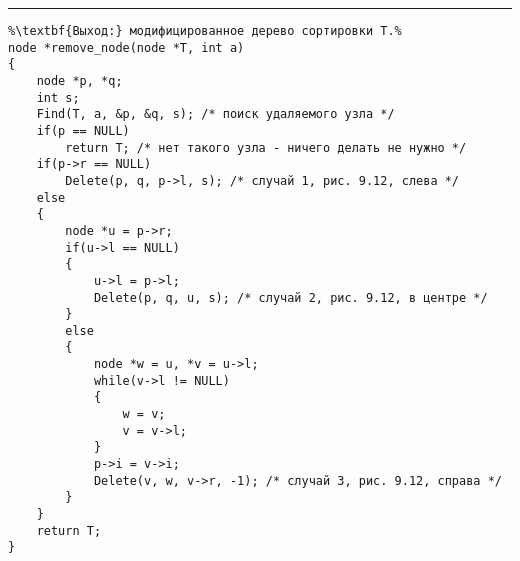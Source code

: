 \vspace{5pt} \hrule
\begin{lstlisting}[caption={Удаление узла из дерева сортировки}, label=p319, escapechar=\%]
%\noindent\textbf{Вход:} дерево сортировки T, заданное указателем на корень; ключ a: key.\\%
%\textbf{Выход:} модифицированное дерево сортировки T.%
node *remove_node(node *T, int a)
{
	node *p, *q;
	int s;
	Find(T, a, &p, &q, s); /* поиск удаляемого узла */
	if(p == NULL)
		return T; /* нет такого узла - ничего делать не нужно */
	if(p->r == NULL)
		Delete(p, q, p->l, s); /* случай 1, рис. 9.12, слева */
	else
	{
		node *u = p->r;
		if(u->l == NULL)
		{
			u->l = p->l;
			Delete(p, q, u, s); /* случай 2, рис. 9.12, в центре */
		}
		else
		{
			node *w = u, *v = u->l;
			while(v->l != NULL)
			{
				w = v;
				v = v->l;
			}
			p->i = v->i;
			Delete(v, w, v->r, -1); /* случай 3, рис. 9.12, справа */
		}
	}
	return T;
}
\end{lstlisting}

